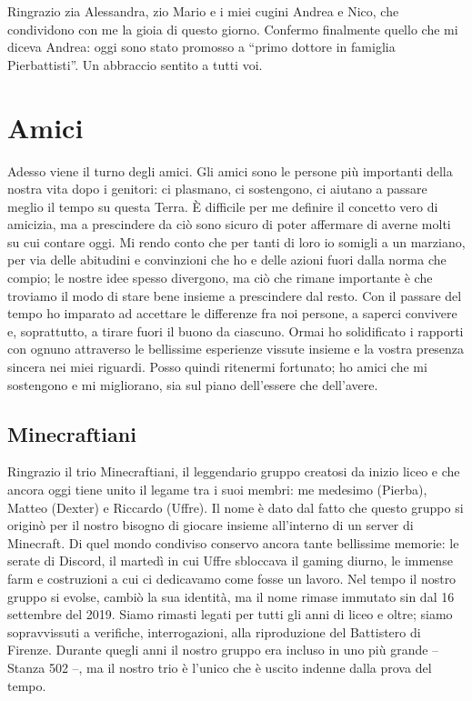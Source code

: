 Ringrazio zia Alessandra, zio Mario e i miei cugini Andrea e
Nico, che condividono con me la gioia di questo giorno. Confermo
finalmente quello che mi diceva Andrea: oggi sono stato promosso a
``primo dottore in famiglia Pierbattisti''. Un abbraccio sentito a
tutti voi.

\section{Amici}
Adesso viene il turno degli amici. Gli amici sono le persone più
importanti della nostra vita dopo i genitori: ci plasmano, ci
sostengono, ci aiutano a passare meglio il tempo su questa Terra. È
difficile per me definire il concetto vero di amicizia, ma a
prescindere da ciò sono sicuro di poter affermare di averne molti su
cui contare oggi. Mi rendo conto che per tanti di loro io somigli a un
marziano, per via delle abitudini e convinzioni che ho e delle azioni
fuori dalla norma che compio; le nostre idee spesso divergono, ma ciò
che rimane importante è che troviamo il modo di stare bene insieme a
prescindere dal resto. Con il passare del tempo ho imparato ad
accettare le differenze fra noi persone, a saperci convivere e,
soprattutto, a tirare fuori il buono da ciascuno. Ormai ho solidificato
i rapporti con ognuno attraverso le bellissime esperienze
vissute insieme e la vostra presenza sincera nei miei riguardi. Posso
quindi ritenermi fortunato; ho amici che mi sostengono e mi migliorano,
sia sul piano dell'essere che dell'avere.

\subsection{Minecraftiani}
Ringrazio il trio Minecraftiani, il leggendario
gruppo creatosi da inizio liceo e che ancora oggi tiene unito il legame
tra i suoi membri: me medesimo (Pierba), Matteo (Dexter) e Riccardo
(Uffre). Il nome è dato dal fatto che questo gruppo si originò per il
nostro bisogno di giocare insieme all'interno di un server di
Minecraft. Di quel mondo condiviso conservo ancora tante bellissime
memorie: le serate di Discord, il martedì in cui Uffre sbloccava il
gaming diurno, le immense farm e costruzioni a cui ci dedicavamo come
fosse un lavoro. Nel tempo il nostro gruppo si evolse, cambiò la sua
identità, ma il nome rimase immutato sin dal 16 settembre del 2019.
Siamo rimasti legati per tutti gli anni di liceo e oltre; siamo
sopravvissuti a verifiche, interrogazioni, alla riproduzione del
Battistero di Firenze. Durante quegli anni il nostro gruppo era incluso
in uno più grande -- Stanza 502 --, ma il nostro trio è l'unico che è
uscito indenne dalla prova del tempo.

